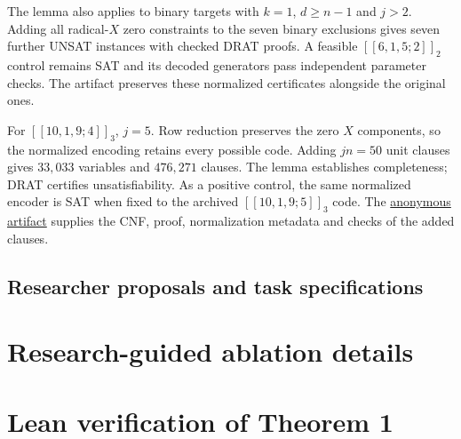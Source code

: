 \documentclass{article}
\newcommand{\artifactlink}{\href{https://anonymous.4open.science/r/llm_guided_EAQECC_search-4099}{anonymous artifact}}
\begin{document}
The lemma also applies to binary targets with $k=1$, $d\ge n-1$
and $j>2$. Adding all radical-$X$ zero constraints to the seven
binary exclusions gives seven further UNSAT instances with checked
DRAT proofs. A feasible $[[6,1,5;2]]_2$ control remains SAT and its
decoded generators pass independent parameter checks. The artifact
preserves these normalized certificates alongside the original ones.

For $[[10,1,9;4]]_3$, $j=5$. Row reduction preserves the zero
$X$ components, so the normalized encoding retains every possible code.
Adding $jn=50$ unit clauses gives $33{,}033$ variables and $476{,}271$ clauses.
The lemma establishes completeness; DRAT certifies unsatisfiability.
As a positive control, the same normalized encoder is SAT when fixed to
the archived $[[10,1,9;5]]_3$ code. The \artifactlink{} supplies the CNF,
proof, normalization metadata and checks of the added clauses.



\begingroup
\raggedbottom
\subsection{Researcher proposals and task specifications}\label{app:prompts}

\endgroup

\section{Research-guided ablation details}\label{app:ablations}

\FloatBarrier

\clearpage
\section{Lean verification of Theorem 1}\label{app:lean}

\end{document}
